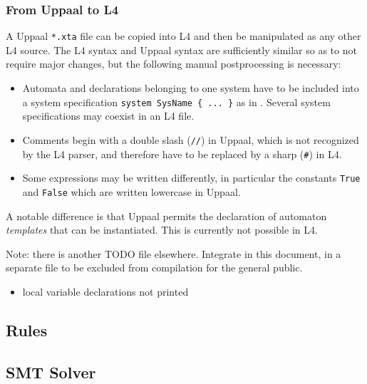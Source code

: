 \subsubsection{From Uppaal to L4}

A Uppaal \texttt{*.xta} file can be copied into L4 and then be manipulated as
any other L4 source. The L4 syntax and Uppaal syntax are sufficiently similar
so as to not require major changes, but the following manual postprocessing is
necessary:
\begin{itemize}
\item Automata and declarations belonging to one system have to be included
  into a system specification \texttt{system SysName \{ ... \}} as in
  . Several system specifications may coexist in an L4
  file.
\item Comments begin with a double slash (\texttt{//}) in Uppaal, which is not
  recognized by the L4 parser, and therefore have to be replaced by a sharp
  (\texttt{\#}) in L4.
\item Some expressions may be written differently, in particular the constants
  \texttt{True} and \texttt{False} which are written lowercase in Uppaal.
\end{itemize}

A notable difference is that Uppaal permits the declaration of automaton
\emph{templates} that can be instantiated. This is currently not possible in L4.



Note: there is another TODO file elsewhere. Integrate in this document, in a separate file to be excluded from compilation for the general public.
\begin{itemize}
\item local variable declarations not printed
\end{itemize}




\subsection{Rules}\label{sec:rules}


\subsection{SMT Solver}\label{sec:smt_solver}


